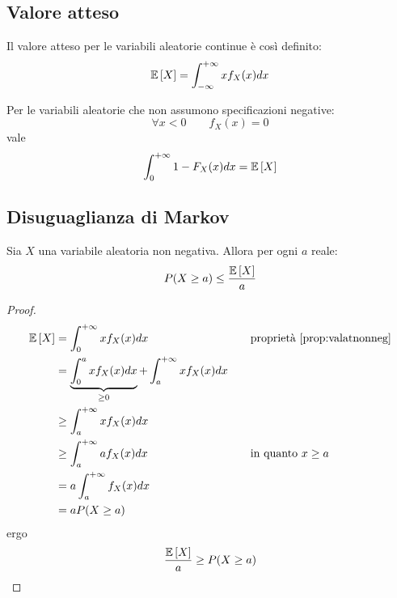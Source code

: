 \subsection{Valore atteso}
\begin{defin}
	Il valore atteso per le variabili aleatorie continue è così definito:
	\begin{equation*}
		\mathbb{E}\left[ X \right]=\int_{-\infty}^{+\infty} x f_X(x)dx
	\end{equation*}
\end{defin}

\begin{prop} \label{prop:valatnonneg}
	Per le variabili aleatorie che non assumono specificazioni negative:
	\begin{equation*}
		\forall x<0 \qquad f_X(x)=0
	\end{equation*}
	vale
	\begin{equation*}
		\int_0^{+\infty} 1-F_X(x)dx = \mathbb{E}\left[ X \right]
	\end{equation*}
\end{prop}

\subsection{Disuguaglianza di Markov}
\begin{teor} \label{teor:markov}
	Sia $X$ una variabile aleatoria non negativa. Allora per ogni $a$ reale:
	\begin{equation*}
		P(X\geq a) \leq \frac{\mathbb{E}\left[ X \right]}{a}
	\end{equation*}
\end{teor}
\begin{proof}
	\begin{align*}
		\mathbb{E}\left[ X \right] & = \int_0^{+\infty} x f_X(x) dx & \quad & \text{proprietà \ref{prop:valatnonneg}}                                 \\
		       & = \underbrace{\int_0^a x f_X(x) dx}_{\geq 0} + \int_a^{+\infty} x f_X(x) dx                          \\
		       & \geq \int_a^{+\infty} x f_X(x) dx                                                                    \\
		       & \geq \int_a^{+\infty} a f_X(x) dx                                           & \quad & \text{in quanto $x\geq a$} \\
		       & = a \int_a^{+\infty} f_X(x) dx                                                                       \\
		       & = a P(X\geq a)
	\end{align*}
	ergo
	\begin{equation*}
		\frac{\mathbb{E}\left[ X \right]}{a}\geq P(X\geq a)
	\end{equation*}
\end{proof}



